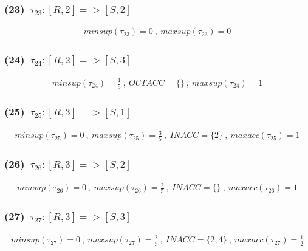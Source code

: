 \documentclass[a4paper,12pt]{jarticle}
\begin{document}
\subsubsection*{(23)~$\tau_{23}:[R,2]=>[S,2]$}
\vspace{-4mm}
%
\begin{align*}
 minsup(\tau_{23})=0~,~maxsup(\tau_{23})=0
\end{align*}
%
\vspace{-10mm}
\subsubsection*{(24)~$\tau_{24}:[R,2]=>[S,3]$}
\vspace{-4mm}
%
\begin{align*}
 minsup(\tau_{24})=\frac{1}{5}~,~OUTACC=\{\}~,~maxsup(\tau_{24})=1
\end{align*}
%
\vspace{-10mm}
\subsubsection*{(25)~$\tau_{25}:[R,3]=>[S,1]$}
\vspace{-4mm}
%
\begin{align*}
 minsup(\tau_{25})=0~,~maxsup(\tau_{25})=\frac{3}{5}~,~INACC=\{2\}~,~maxacc(\tau_{25})=1
\end{align*}
%
\vspace{-10mm}
\subsubsection*{(26)~$\tau_{26}:[R,3]=>[S,2]$}
\vspace{-4mm}
%
\begin{align*}
 minsup(\tau_{26})=0~,~maxsup(\tau_{26})=\frac{2}{5}~,~INACC=\{\}~,~maxacc(\tau_{26})=1
\end{align*}
%
\vspace{-10mm}
\subsubsection*{(27)~$\tau_{27}:[R,3]=>[S,3]$}
\vspace{-4mm}
%
\begin{align*}
 minsup(\tau_{27})=0~,~maxsup(\tau_{27})=\frac{2}{5}~,~INACC=\{2,4\}~,~maxacc(\tau_{27})=\frac{1}{2}
\end{align*}
%
\end{document}
